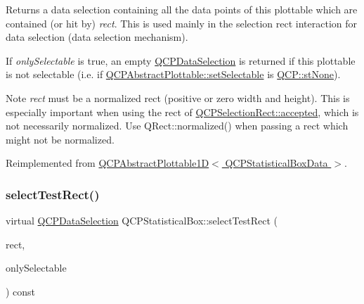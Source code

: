 Returns a data selection containing all the data points of this plottable which are contained (or hit by) {\itshape rect}. This is used mainly in the selection rect interaction for data selection (data selection mechanism).

If {\itshape only\+Selectable} is true, an empty \hyperlink{class_q_c_p_data_selection}{Q\+C\+P\+Data\+Selection} is returned if this plottable is not selectable (i.\+e. if \hyperlink{class_q_c_p_abstract_plottable_ac238d6e910f976f1f30d41c2bca44ac3}{Q\+C\+P\+Abstract\+Plottable\+::set\+Selectable} is \hyperlink{namespace_q_c_p_ac6cb9db26a564b27feda362a438db038a2cb7996ccc6c39b9e6d20f2e46bf3f57}{Q\+C\+P\+::st\+None}).

\begin{DoxyNote}{Note}
{\itshape rect} must be a normalized rect (positive or zero width and height). This is especially important when using the rect of \hyperlink{class_q_c_p_selection_rect_a15a43542e1f7b953a44c260b419e6d2c}{Q\+C\+P\+Selection\+Rect\+::accepted}, which is not necessarily normalized. Use {\ttfamily Q\+Rect\+::normalized()} when passing a rect which might not be normalized. 
\end{DoxyNote}


Reimplemented from \hyperlink{class_q_c_p_abstract_plottable1_d_ac385c38a79e419ed3600c2ee398fd216}{Q\+C\+P\+Abstract\+Plottable1\+D$<$ Q\+C\+P\+Statistical\+Box\+Data $>$}.

\mbox{\label{class_q_c_p_statistical_box_a7047863d59673d8d049bf26cfdd9912c}} 
\subsubsection{\texorpdfstring{select\+Test\+Rect()}{selectTestRect()}\hspace{0.1cm}{\footnotesize\ttfamily [2/2]}}
{\footnotesize\ttfamily virtual \hyperlink{class_q_c_p_data_selection}{Q\+C\+P\+Data\+Selection} Q\+C\+P\+Statistical\+Box\+::select\+Test\+Rect (\begin{DoxyParamCaption}\item[{const Q\+RectF \&}]{rect,  }\item[{bool}]{only\+Selectable }\end{DoxyParamCaption}) const\hspace{0.3cm}{\ttfamily [virtual]}}

